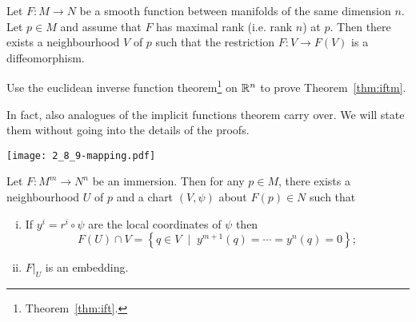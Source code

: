 \begin{theorem}\label{thm:iftm}
  Let $F:M\to N$ be a smooth function between manifolds of the same dimension $n$.
  Let $p\in M$ and assume that $F$ has maximal rank (i.e. rank $n$) at $p$.
  Then there exists a neighbourhood $V$ of $p$ such that the restriction $F:V\to F(V)$ is a diffeomorphism.
\end{theorem}
\begin{exercise}
  Use the euclidean inverse function theorem\footnote{Theorem~\ref{thm:ift}.} on $\mathbb{R}^n$ to prove Theorem~\ref{thm:iftm}.
\end{exercise}


In fact, also analogues of the implicit functions theorem carry over.
We will state them without going into the details of the proofs.

\begin{marginfigure}[5.5em]
  \texttt{[image: 2\_8\_9-mapping.pdf]}
\end{marginfigure}
\begin{proposition}\label{prop:slice_chart}
  Let $F:M^m\to N^n$ be an immersion.
  Then for any $p\in M$, there exists a neighbourhood $U$ of $p$ and a chart $(V,\psi)$ about $F(p)\in N$ such that
  \begin{enumerate}[(i)]
    \item If $y^i = r^i\circ \psi$ are the local coordinates of $\psi$ then
    \begin{equation}\label{eq:slice_chart}
      F(U)\cap V = \left\{ q \in V \;\mid\; y^{m+1}(q)=\cdots=y^n(q)=0\right\};
    \end{equation}
    \item $F\big|_U$ is an embedding.
  \end{enumerate}
 \end{proposition}

